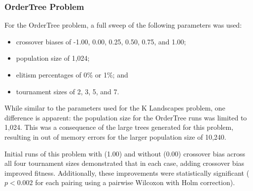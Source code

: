 \documentclass{sig-alternate}
\begin{document}
%
%
%
%

%
%
%
%

\subsubsection{OrderTree Problem}

For the OrderTree problem, a full sweep of the following parameters was used:

\begin{itemize}
	\item crossover biases of -1.00, 0.00, 0.25, 0.50, 0.75, and 1.00;
	\item population size of 1,024;
	\item elitism percentages of 0\% or 1\%; and
	\item tournament sizes of 2, 3, 5, and 7.
\end{itemize}

While similar to the parameters used for the K Landscapes problem, one difference is apparent: the population size for
the OrderTree runs was limited to 1,024. This was a consequence of the large trees generated for this problem,
resulting in out of memory errors for the larger population size of 10,240.

Initial runs of this problem with (1.00) and without (0.00) crossover bias across all four tournament sizes
demonstrated that in each case, adding crossover bias improved fitness. Additionally, these improvements were
statistically significant ($p < 0.002$ for each pairing using a pairwise Wilcoxon with Holm correction).
\end{document}
